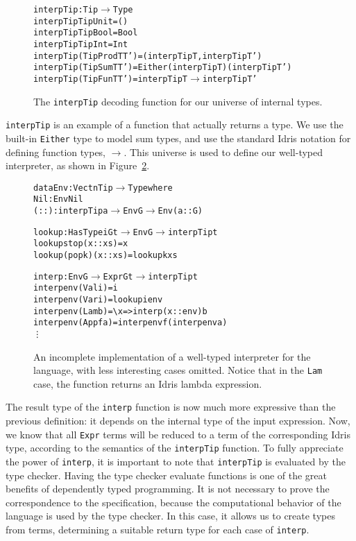 \begin{figure}
\begin{alltt}
interpTip : Tip \(\to\) Type
interpTip TipUnit        = ()
interpTip TipBool        = Bool
interpTip TipInt         = Int
interpTip (TipProd T T') = (interpTip T, interpTip T')
interpTip (TipSum T T')  = Either (interpTip T) (interpTip T')
interpTip (TipFun T T')  = interpTip T \(\to\) interpTip T'
\end{alltt}
\caption{The \texttt{interpTip} decoding function for our universe of internal types.}
\label{fig:interpTip}
\end{figure}

\texttt{interpTip} is an example of a function that actually returns a type. We use the built-in \texttt{Either} type to model sum types, and use the standard Idris notation for defining function types, $\to$. This universe is used to define our well-typed interpreter, as shown in Figure~\ref{fig:well-typed-interpreter}.

\begin{figure}
\begin{alltt}
data Env : Vect n Tip \(\to\) Type where
  Nil  : Env Nil
  (::) : interpTip a \(\to\) Env G \(\to\) Env (a :: G)

lookup : HasType i G t \(\to\) Env G \(\to\) interpTip t
lookup stop    (x :: xs) = x
lookup (pop k) (x :: xs) = lookup k xs

interp : Env G \(\to\) Expr G t \(\to\) interpTip t
interp env (Val i)   = i
interp env (Var i)   = lookup i env
interp env (Lam b)   = \textbackslash{x} => interp (x :: env) b
interp env (App f a) = interp env f (interp env a)
\vdots
\end{alltt}
\caption{An incomplete implementation of a well-typed interpreter for the language, with less interesting cases omitted. Notice that in the \texttt{Lam} case, the function returns an Idris lambda expression.}
\label{fig:well-typed-interpreter}
\end{figure}

The result type of the \texttt{interp} function is now much more expressive than the previous definition: it depends on the internal type of the input expression. Now, we know that all \texttt{Expr} terms will be reduced to a term of the corresponding Idris type, according to the semantics of the \texttt{interpTip} function. To fully appreciate the power of \texttt{interp}, it is important to note that \texttt{interpTip} is evaluated by the type checker. Having the type checker evaluate functions is one of the great benefits of dependently typed programming. It is not necessary to prove the correspondence to the specification, because the computational behavior of the language is used by the type checker. In this case, it allows us to create types from terms, determining a suitable return type for each case of \texttt{interp}.

